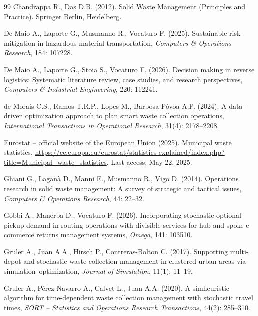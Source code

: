 \documentclass[authoryear,preprint,12pt]{elsarticle}
\begin{document}
\begin{thebibliography}{99}
Chandrappa R., Das D.B. (2012). Solid Waste Management (Principles and Practice). Springer Berlin, Heidelberg.

De Maio A., Laporte G., Musmanno R., Vocaturo F. (2025). Sustainable risk mitigation in hazardous material transportation, \textit{Computers \& Operations Research}, 184: 107228. 

De Maio A., Laporte G., Stoia S., Vocaturo F. (2026). Decision making in reverse logistics: Systematic literature review, case studies, and
research perspectives, \textit{Computers \& Industrial Engineering}, 220: 112241.

de Morais C.S., Ramos T.R.P., Lopes M., Barbosa-Póvoa A.P. (2024). A data--driven optimization approach to plan smart waste collection operations, \textit{International Transactions in Operational Research}, 31(4): 2178--2208.

Eurostat -- official website of the European Union (2025). Municipal waste statistics, \url{https://ec.europa.eu/eurostat/statistics-explained/index.php?title=Municipal_waste_statistics}. Last access: May 22, 2025.

Ghiani G., Laganà D., Manni E., Musmanno R., Vigo D. (2014). Operations research in solid waste management: A survey of strategic and tactical issues, \textit{Computers \& Operations Research}, 44: 22--32. 

Gobbi A., Manerba D., Vocaturo F. (2026). Incorporating stochastic optional pickup demand in routing operations with divisible services for hub-and-spoke e-commerce returns management systems, \textit{Omega}, 141: 103510. 

Gruler A., Juan A.A., Hirsch P., Contreras-Bolton C. (2017). Supporting multi-depot and stochastic waste collection management in clustered urban areas via simulation–optimization, \textit{Journal of Simulation}, 11(1): 11--19.

Gruler A., Pérez-Navarro A., Calvet L.,  Juan A.A. (2020). A simheuristic algorithm for time-dependent
 waste collection management with stochastic
 travel times, \textit{SORT -- Statistics and Operations Research Transactions}, 44(2): 285--310.


\end{thebibliography}
\end{document}

